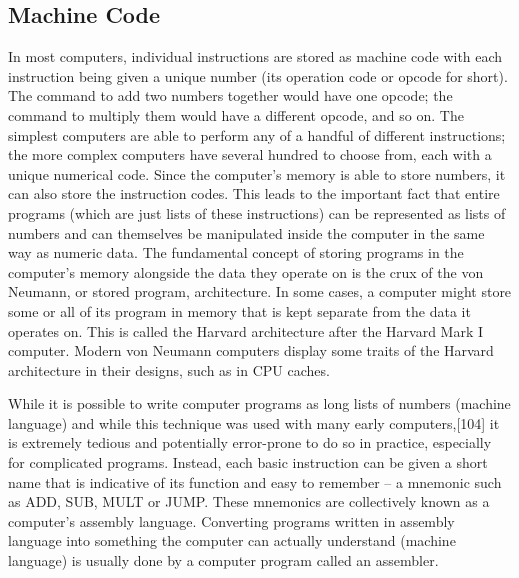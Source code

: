 \documentclass[a4paper,11pt]{article}
\begin{document}
\subsection{Machine Code}
In most computers, individual instructions are stored as machine code with each instruction being given a unique number (its operation code or opcode for short). The command to add two numbers together would have one opcode; the command to multiply them would have a different opcode, and so on. The simplest computers are able to perform any of a handful of different instructions; the more complex computers have several hundred to choose from, each with a unique numerical code. Since the computer's memory is able to store numbers, it can also store the instruction codes. This leads to the important fact that entire programs (which are just lists of these instructions) can be represented as lists of numbers and can themselves be manipulated inside the computer in the same way as numeric data. The fundamental concept of storing programs in the computer's memory alongside the data they operate on is the crux of the von Neumann, or stored program, architecture. In some cases, a computer might store some or all of its program in memory that is kept separate from the data it operates on. This is called the Harvard architecture after the Harvard Mark I computer. Modern von Neumann computers display some traits of the Harvard architecture in their designs, such as in CPU caches.

While it is possible to write computer programs as long lists of numbers (machine language) and while this technique was used with many early computers,[104] it is extremely tedious and potentially error-prone to do so in practice, especially for complicated programs. Instead, each basic instruction can be given a short name that is indicative of its function and easy to remember – a mnemonic such as ADD, SUB, MULT or JUMP. These mnemonics are collectively known as a computer's assembly language. Converting programs written in assembly language into something the computer can actually understand (machine language) is usually done by a computer program called an assembler. 
\end{document}
